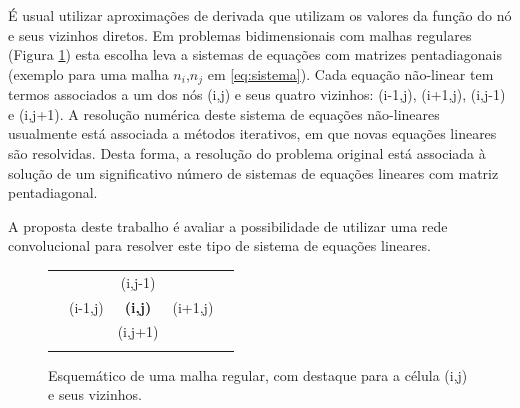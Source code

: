 \documentclass[final,5p]{elsarticle}
\numberwithin{equation}{section}
\begin{document}
    É usual utilizar aproximações de derivada que utilizam os valores da função do nó e seus vizinhos diretos. Em problemas bidimensionais com malhas regulares (Figura \ref{fig:esquematico}) esta escolha leva a sistemas de equações com matrizes pentadiagonais (exemplo para uma malha $n_i$,$n_j$ em \ref{eq:sistema}). Cada equação não-linear tem termos associados a um dos nós (i,j) e seus quatro vizinhos: (i-1,j), (i+1,j), (i,j-1) e (i,j+1). A resolução numérica deste sistema de equações não-lineares usualmente está associada a métodos iterativos, em que novas equações lineares são resolvidas. Desta forma, a resolução do problema original está associada à solução de um significativo número de sistemas de equações lineares com matriz pentadiagonal.

    A proposta deste trabalho é avaliar a possibilidade de utilizar uma rede convolucional para resolver este tipo de sistema de equações lineares.

    \begin{figure}
    \begin{center}
        \caption{Esquemático de uma malha regular, com destaque para a célula (i,j) e seus vizinhos.}
        \label{fig:esquematico}
        \vspace{5pt}
        \begin{tabular}{c|c|c|c|c}
            & &  & & \\
            \hline
            & & (i,j-1) & & \\
            \hline
            & (i-1,j) & \textbf{(i,j)} & (i+1,j) & \\
            \hline
            & & (i,j+1) & & \\
            \hline
            & &  & & \\
        \end{tabular}
    \end{center}
    \end{figure}
\end{document}
